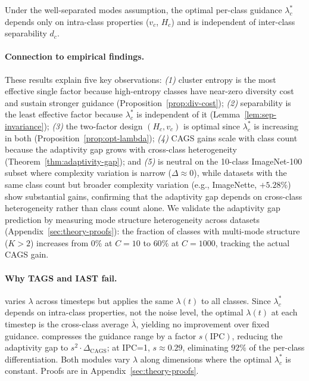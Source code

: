 \begin{lemma}
\label{lem:sep-invariance}
Under the well-separated modes assumption, the optimal per-class guidance $\lambda_c^*$ depends only on intra-class properties ($v_c$, $H_c$) and is independent of inter-class separability $d_c$.
\end{lemma}

\paragraph{Connection to empirical findings.}
These results explain five key observations: \emph{(1)} cluster entropy is the most effective single factor because high-entropy classes have near-zero diversity cost and sustain stronger guidance (Proposition~\ref{prop:div-cost}); \emph{(2)} separability is the least effective factor because $\lambda_c^*$ is independent of it (Lemma~\ref{lem:sep-invariance}); \emph{(3)} the two-factor design $(H_c, v_c)$ is optimal since $\lambda_c^*$ is increasing in both (Proposition~\ref{prop:opt-lambda}); \emph{(4)} CAGS gains scale with class count because the adaptivity gap grows with cross-class heterogeneity (Theorem~\ref{thm:adaptivity-gap}); and \emph{(5)} \cags{} is neutral on the 10-class ImageNet-100 subset where complexity variation is narrow ($\Delta \approx 0$), while datasets with the same class count but broader complexity variation (e.g., ImageNette, $+5.28\%$) show substantial gains, confirming that the adaptivity gap depends on cross-class heterogeneity rather than class count alone. We validate the adaptivity gap prediction by measuring mode structure heterogeneity across datasets (Appendix~\ref{sec:theory-proofs}): the fraction of classes with multi-mode structure ($K > 2$) increases from $0\%$ at $C{=}10$ to $60\%$ at $C{=}1000$, tracking the actual CAGS gain.

\paragraph{Why TAGS and IAST fail.}
\tags{} varies $\lambda$ across timesteps but applies the same $\lambda(t)$ to all classes. Since $\lambda_c^*$ depends on intra-class properties, not the noise level, the optimal $\lambda(t)$ at each timestep is the cross-class average $\bar{\lambda}$, yielding no improvement over fixed guidance. \iast{} compresses the guidance range by a factor $s(\text{IPC})$, reducing the adaptivity gap to $s^2 \cdot \Delta_{\text{CAGS}}$; at IPC=1, $s \approx 0.29$, eliminating $92\%$ of the per-class differentiation. Both modules vary $\lambda$ along dimensions where the optimal $\lambda_c^*$ is constant. Proofs are in Appendix~\ref{sec:theory-proofs}.
